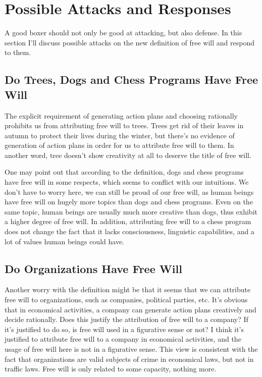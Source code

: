 \section{Possible Attacks and Responses}

A good boxer should not only be good at attacking, but also defense. In this section I'll discuss possible attacks on the new definition of free will and respond to them.

\subsection{Do Trees, Dogs and Chess Programs Have Free Will}

The explicit requirement of generating action plans and choosing rationally prohibits us from attributing free will to trees. Trees get rid of their leaves in autumn to protect their lives during the winter, but there’s no evidence of generation of action plans in order for us to attribute free will to them. In another word, tree doesn't show creativity at all to deserve the title of free will.

One may point out that according to the definition, dogs and chess programs have free will in some respects, which seems to conflict with our intuitions. We don’t have to worry here, we can still be proud of our free will, as human beings have free will on hugely more topics than dogs and chess programs. Even on the same topic, human beings are usually much more creative than dogs, thus exhibit a higher degree of free will. In addition, attributing free will to a chess program does not change the fact that it lacks consciousness, linguistic capabilities, and a lot of values human beings could have.

\subsection{Do Organizations Have Free Will}

Another worry with the definition might be that it seems that we can attribute free will to organizations, such as companies, political parties, etc. It’s obvious that in economical activities, a company can generate action plans creatively and decide rationally. Does this justify the attribution of free will to a company? If it’s justified to do so, is free will used in a figurative sense or not? I think it’s justified to attribute free will to a company in economical activities, and the usage of free will here is not in a figurative sense. This view is consistent with the fact that organizations are valid subjects of crime in economical laws, but not in traffic laws. Free will is only related to some capacity, nothing more.


